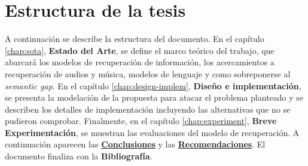 
\section{Estructura de la tesis}
\label{sec:structure}

A continuación se describe la estructura del documento.  En el capítulo \ref{chap:sota}, \textbf{Estado del Arte}, se define el marco teórico del trabajo, que abarcará los modelos de recuperación de información, los acercamientos a recuperación de audios y música, modelos de lenguaje y como sobreponerse al \textit{semantic gap}. En el capítulo \ref{chap:design-implem}, \textbf{Diseño e implementación}, se presenta la modelación de la propuesta para atacar el problema planteado y se describen los detalles de implementación incluyendo las alternativas que no se pudieron comprobar. Finalmente, en el capítulo \ref{chap:experiment}, \textbf{Breve Experimentación}, se muestran las evaluaciones del modelo de recuperación. A continuación aparecen las \hyperref[chap:conclusions]{\textbf{Conclusiones}} y las \hyperref[chap:recommendations]{\textbf{Recomendaciones}}. El documento finaliza con la \textbf{Bibliografía}.
